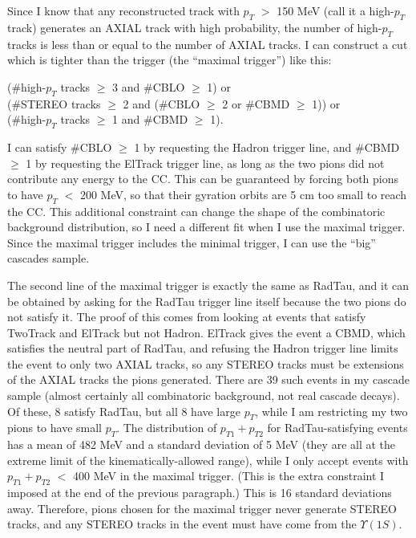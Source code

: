 Since I know that any reconstructed track with $p_T$ $>$ 150 MeV (call
it a high-$p_T$ track) generates an AXIAL track with high probability,
the number of high-$p_T$ tracks is less than or equal to the number of
AXIAL tracks.  I can construct a cut which is tighter than the trigger
(the ``maximal trigger'') like this:
\begin{center}
  (\#high-$p_T$ tracks $\ge$ 3 and \#CBLO $\ge$ 1) or \mbox{\hspace{6 cm}} \\
  (\#STEREO tracks $\ge$ 2 and (\#CBLO $\ge$ 2 or \#CBMD $\ge$ 1)) or \\
  \mbox{\hspace{5 cm}} (\#high-$p_T$ tracks $\ge$ 1 and \#CBMD $\ge$ 1).
\end{center}
I can satisfy \#CBLO $\ge$ 1 by requesting the Hadron trigger line,
and \#CBMD $\ge$ 1 by requesting the ElTrack trigger line, as long as
the two pions did not contribute any energy to the CC.  This can be
guaranteed by forcing both pions to have $p_T$ $<$ 200 MeV, so that
their gyration orbits are 5 cm too small to reach the CC.  This
additional constraint can change the shape of the combinatoric
background distribution, so I need a different fit when I use the
maximal trigger.  Since the maximal trigger includes the minimal
trigger, I can use the ``big'' cascades sample.

The second line of the maximal trigger is exactly the same as RadTau,
and it can be obtained by asking for the RadTau trigger line itself
because the two pions do not satisfy it.  The proof of this comes from
looking at events that satisfy TwoTrack and ElTrack but not Hadron.
ElTrack gives the event a CBMD, which satisfies the neutral part of
RadTau, and refusing the Hadron trigger line limits the event to only
two AXIAL tracks, so any STEREO tracks must be extensions of the AXIAL
tracks the pions generated.  There are 39 such events in my cascade
sample (almost certainly all combinatoric background, not real cascade
decays).  Of these, 8 satisfy RadTau, but all 8 have large $p_T$,
while I am restricting my two pions to have small $p_T$.  The
distribution of $p_{T1} + p_{T2}$ for RadTau-satisfying events has a
mean of 482 MeV and a standard deviation of 5 MeV (they are all at the
extreme limit of the kinematically-allowed range), while I only accept
events with $p_{T1} + p_{T2}$ $<$ 400 MeV in the maximal trigger.
(This is the extra constraint I imposed at the end of the previous
paragraph.)  This is 16 standard deviations away.  Therefore, pions
chosen for the maximal trigger never generate STEREO tracks, and any
STEREO tracks in the event must have come from the $\Upsilon(1S)$.

